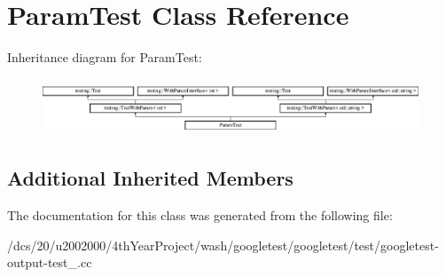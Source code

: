 \hypertarget{classParamTest}{}\section{Param\+Test Class Reference}
\label{classParamTest}
Inheritance diagram for Param\+Test\+:\begin{figure}[H]
\begin{center}
\leavevmode
\includegraphics[height=1.686747cm]{classParamTest}
\end{center}
\end{figure}
\subsection*{Additional Inherited Members}


The documentation for this class was generated from the following file\+:\begin{DoxyCompactItemize}
\item 
/dcs/20/u2002000/4th\+Year\+Project/wash/googletest/googletest/test/googletest-\/output-\/test\+\_\+.\+cc\end{DoxyCompactItemize}
